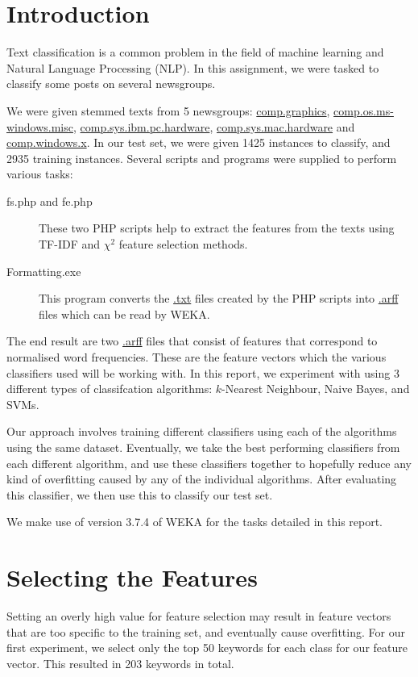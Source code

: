 \documentclass[12pt]{article}
\begin{document}
\maketitle
\section{Introduction}
Text classification is a common problem in the field of machine learning and Natural Language Processing (NLP). In this assignment, we were tasked to classify some posts on several newsgroups.

We were given stemmed texts from 5 newsgroups: \url{comp.graphics}, \url{comp.os.ms-windows.misc}, \url{comp.sys.ibm.pc.hardware}, \url{comp.sys.mac.hardware} and \url{comp.windows.x}. In our test set, we were given 1425 instances to classify, and 2935 training instances. Several scripts and programs were supplied to perform various tasks:
\begin{description}
	\item[fs.php and fe.php] These two PHP scripts help to extract the features from the texts using \textsc{TF-IDF} and $\chi^2$ feature selection methods.
	\item[Formatting.exe] This program converts the \url{.txt} files created by the PHP scripts into \url{.arff} files which can be read by WEKA.
\end{description}
The end result are two \url{.arff} files that consist of features that correspond to normalised word frequencies. These are the feature vectors which the various classifiers used will be working with. In this report, we experiment with using 3 different types of classifcation algorithms: $k$-Nearest Neighbour, Naive Bayes, and SVMs. 

Our approach involves training different classifiers using each of the algorithms using the same dataset. Eventually, we take the best performing classifiers from each different algorithm, and use these classifiers together to hopefully reduce any kind of overfitting caused by any of the individual algorithms. After evaluating this classifier, we then use this to classify our test set.

We make use of version 3.7.4 of WEKA for the tasks detailed in this report.

\section{Selecting the Features}
 Setting an overly high value for feature selection may result in feature vectors that are too specific to the training set, and eventually cause overfitting. For our first experiment, we select only the top 50 keywords for each class for our feature vector. This resulted in 203 keywords in total.
\end{document}
